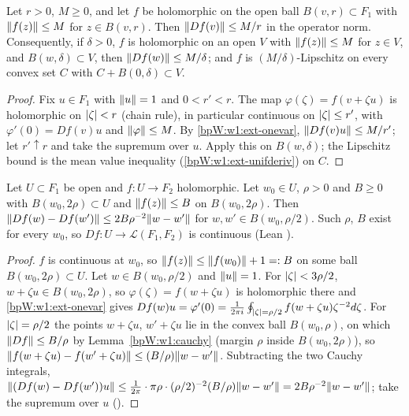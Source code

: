 \begin{lemma}\label{bpW:w1:cauchy}
Let $r>0$, $M\ge0$, and let $f$ be holomorphic on the open ball $B(v,r)\subset F_1$ with $\lVert f(z)\rVert\le M$ for
$z\in B(v,r)$. Then $\lVert Df(v)\rVert\le M/r$ in the operator norm. Consequently, if $\delta>0$, $f$ is holomorphic on an
open $V$ with $\lVert f(z)\rVert\le M$ for $z\in V$, and $B(w,\delta)\subset V$, then $\lVert Df(w)\rVert\le M/\delta$; and $f$ is
$(M/\delta)$-Lipschitz on every convex set $C$ with $C+B(0,\delta)\subset V$.
\end{lemma}

\begin{proof}
\label{stepW:w1:lines}
Fix $u\in F_1$ with $\lVert u\rVert=1$ and $0<r'<r$. The map $\varphi(\zeta)=f(v+\zeta u)$ is holomorphic on $\lvert \zeta\rvert<r$
(chain rule), in particular continuous on $\lvert \zeta\rvert\le r'$, with $\varphi'(0)=Df(v)u$ and $\lVert \varphi\rVert\le M$.
\label{stepW:w1:onevar}
By \ref{bpW:w1:ext-onevar}, $\lVert Df(v)u\rVert\le M/r'$; let $r'\uparrow r$ and take the supremum over $u$.
\label{stepW:w1:margins}
Apply this on $B(w,\delta)$; the Lipschitz bound is the mean value inequality (\ref{bpW:w1:ext-unifderiv}) on $C$.
\end{proof}

\begin{lemma}\label{bpW:w1:deriv-continuous}
Let $U\subset F_1$ be open and $f:U\to F_2$ holomorphic. Let $w_0\in U$, $\rho>0$ and $B\ge0$ with
$B(w_0,2\rho)\subset U$ and $\lVert f(z)\rVert\le B$ on $B(w_0,2\rho)$. Then
$\lVert Df(w)-Df(w')\rVert\le2B\rho^{-2}\lVert w-w'\rVert$ for $w,w'\in B(w_0,\rho/2)$. Such $\rho$, $B$ exist for every $w_0$, so
$Df:U\to\mathcal L(F_1,F_2)$ is continuous (Lean ).
\end{lemma}

\begin{proof}
\label{stepW:w1:dcbound}
$f$ is continuous at $w_0$, so $\lVert f(z)\rVert\le\lVert f(w_0)\rVert+1=:B$ on some ball $B(w_0,2\rho)\subset U$.
\label{stepW:w1:dcintegral}
Let $w\in B(w_0,\rho/2)$ and $\lVert u\rVert=1$. For $\lvert \zeta\rvert<3\rho/2$, $w+\zeta u\in B(w_0,2\rho)$, so
$\varphi(\zeta)=f(w+\zeta u)$ is holomorphic there and \ref{bpW:w1:ext-onevar} gives
$Df(w)u=\varphi'(0)=\frac1{2\pi i}\oint_{\lvert \zeta\rvert=\rho/2}f(w+\zeta u)\zeta^{-2}d\zeta$.
\label{stepW:w1:dclip}
For $\lvert \zeta\rvert=\rho/2$ the points $w+\zeta u$, $w'+\zeta u$ lie in the convex ball $B(w_0,\rho)$, on which
$\lVert Df\rVert\le B/\rho$ by Lemma~\ref{bpW:w1:cauchy} (margin $\rho$ inside $B(w_0,2\rho)$), so
$\lVert f(w+\zeta u)-f(w'+\zeta u)\rVert\le(B/\rho)\lVert w-w'\rVert$. Subtracting the two Cauchy integrals,
$\lVert (Df(w)-Df(w'))u\rVert\le\frac1{2\pi}\cdot\pi\rho\cdot(\rho/2)^{-2}(B/\rho)\lVert w-w'\rVert=2B\rho^{-2}\lVert w-w'\rVert$;
take the supremum over $u$ ().
\end{proof}

